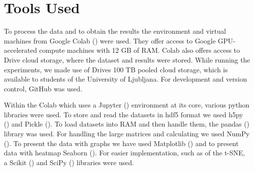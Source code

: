 \section{Tools Used}

To process the data and to obtain the results the environment and virtual machines from Google Colab (\cite{colab}) were used.
They offer access to Google GPU-accelerated compute machines with 12 GB of RAM. 
Colab also offers access to Drive cloud storage, where the dataset and results were stored.
While running the experiments, we made use of Drives 100 TB pooled cloud storage, which is available to students of the University of Ljubljana. 
For development and version control, GitHub was used. 

Within the Colab which uses a Jupyter (\cite{jupyter}) environment at its core, various python libraries were used.
To store and read the datasets in hdf5 format we used h5py  (\cite{hdf5}) and Pickle  (\cite{pickle}).
To load datasets into RAM and then handle them, the pandas  (\cite{pandas}) library was used.
For handling the large matrices and calculating we used NumPy  (\cite{numpy}).
To present the data with graphs we have used Matplotlib  (\cite{matplotlib}) and to present data with heatmap Seaborn  (\cite{seaborn}).
For easier implementation, such as of the t-SNE, a Scikit  (\cite{scikit}) and SciPy  (\cite{scipy}) libraries were used.
